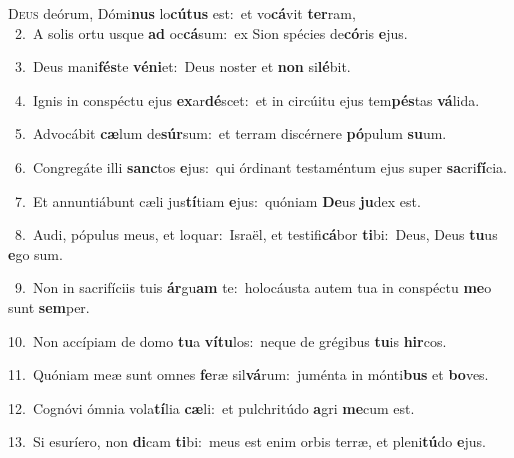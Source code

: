 \lettrine{\initial\textcolor{\initialcolor}{D}}{eus} deórum, Dómi\textbf{nus} lo\-\textbf{cú}\-\textbf{tus} est:~\star et vo\-\textbf{cá}\-vit \textbf{ter}\-ram,\\
{\numbfont\textcolor{\numbcolor}{~2.}}~A solis ortu usque \textbf{ad} oc\-\textbf{cá}\-sum:~\star ex Sion spécies de\-\textbf{có}\-ris \textbf{e}\-jus.\par
{\numbfont\textcolor{\numbcolor}{~3.}}~Deus mani\-\textbf{fés}\-te \textbf{vé}\-\textbf{ni}et:~\star Deus noster et \textbf{non} si\-\textbf{lé}\-bit.\par
{\numbfont\textcolor{\numbcolor}{~4.}}~Ignis in conspéctu ejus \textbf{ex}\-ar\-\textbf{dé}\-scet:~\star et in circúitu ejus tem\-\textbf{pés}\-tas \textbf{vá}\-lida.\par
{\numbfont\textcolor{\numbcolor}{~5.}}~Advocábit \textbf{cæ}\-lum de\-\textbf{súr}\-sum:~\star et terram discérnere \textbf{pó}\-pulum \textbf{su}\-um.\par
{\numbfont\textcolor{\numbcolor}{~6.}}~Congregáte illi \textbf{sanc}\-tos \textbf{e}\-jus:~\star qui órdinant testaméntum ejus super \textbf{sa}\-cri\-\textbf{fí}\-cia.\par
{\numbfont\textcolor{\numbcolor}{~7.}}~Et annuntiábunt cæli jus\-\textbf{tí}\-tiam \textbf{e}\-jus:~\star quóniam \textbf{De}\-us \textbf{ju}\-dex est.\par
{\numbfont\textcolor{\numbcolor}{~8.}}~Audi, pópulus meus, et loquar:~\dagger Israël, et testifi\-\textbf{cá}\-bor \textbf{ti}\-bi:~\star Deus, Deus \textbf{tu}\-us \textbf{e}\-go sum.\par
{\numbfont\textcolor{\numbcolor}{~9.}}~Non in sacrifíciis tuis \textbf{ár}\-gu\textbf{am} te:~\star holocáusta autem tua in conspéctu \textbf{me}\-o sunt \textbf{sem}\-per.\par
{\numbfont\textcolor{\numbcolor}{10.}}~Non accípiam de domo \textbf{tu}\-a \textbf{ví}\-\textbf{tu}los:~\star neque de grégibus \textbf{tu}\-is \textbf{hir}\-cos.\par
{\numbfont\textcolor{\numbcolor}{11.}}~Quóniam meæ sunt omnes \textbf{fe}\-ræ sil\-\textbf{vá}\-rum:~\star juménta in mónti\textbf{bus} et \textbf{bo}\-ves.\par
{\numbfont\textcolor{\numbcolor}{12.}}~Cognóvi ómnia vola\-\textbf{tí}\-lia \textbf{cæ}\-li:~\star et pulchritúdo \textbf{a}\-gri \textbf{me}\-cum est.\par
{\numbfont\textcolor{\numbcolor}{13.}}~Si esuríero, non \textbf{di}\-cam \textbf{ti}\-bi:~\star meus est enim orbis terræ, et pleni\-\textbf{tú}\-do \textbf{e}\-jus.\par
